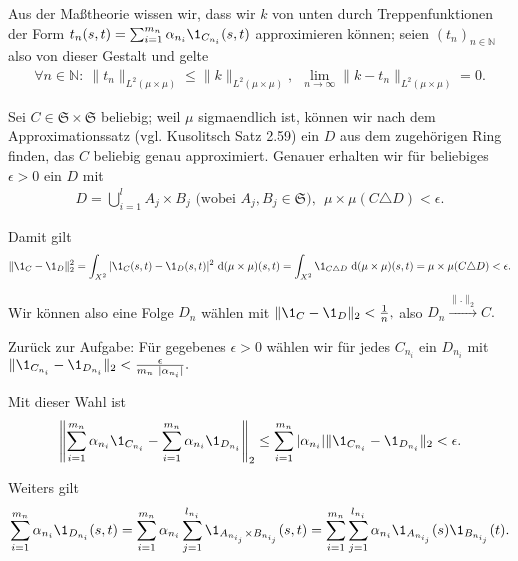 \begin{solution}
\begin{enumerate}[label = (\alph*)]
Aus der Maßtheorie wissen wir, dass wir $k$ von unten durch Treppenfunktionen der Form $t_n(s,t) = \sum_{i=1}^{m_n} \alpha_{n_i} \1_{C_{n_i}}(s,t)$ approximieren können; seien $(t_n)_{n \in \mathbb{N}}$ also von dieser Gestalt und gelte
\begin{align}
    \forall n \in \mathbb{N}:~ \|t_n\|_{L^2(\mu\times\mu)} \leq \|k\|_{L^2(\mu\times\mu)}, ~~\lim\limits_{n \rightarrow \infty}{\|k-t_n\|_{L^2(\mu\times\mu)}} = 0.
\end{align}

Sei $C \in \mathfrak{S} \times \mathfrak{S}$ beliebig; weil $\mu$ sigmaendlich ist, können wir nach dem Approximationssatz (vgl. Kusolitsch Satz 2.59) ein $D$ aus dem zugehörigen Ring finden, das $C$ beliebig genau approximiert. Genauer erhalten wir für beliebiges $\epsilon > 0$ ein $D$ mit
\begin{align}
    D = \bigcup_{i=1}^{l} A_j \times B_j \text{~(wobei~} A_j, B_j \in \mathfrak{S}), ~~\mu\times\mu(C \triangle D) < \epsilon.
\end{align}

Damit gilt
\begin{align}
    \|\1_C - \1_D\|_2^2 = \int_{X^2} |\1_C(s,t) - \1_D(s,t)|^2 ~\mathrm{d}(\mu\times\mu)(s,t) = \int_{X^2} \1_{C \triangle D}~\mathrm{d}(\mu\times\mu)(s,t) = \mu\times\mu(C \triangle D) < \epsilon.
\end{align}

Wir können also eine Folge $D_n$ wählen mit $\|\1_C - \1_D\|_2 < \frac{1}{n},$ also $D_n \xrightarrow{\|.\|_2} C.$

Zurück zur Aufgabe: Für gegebenes $\epsilon > 0$ wählen wir für jedes $C_{n_i}$ ein $D_{n_i}$ mit $\|\1_{C_{n_i}} - \1_{D_{n_i}}\|_2 < \frac{\epsilon}{m_n ~|\alpha_{n_i}|}.$

Mit dieser Wahl ist
\begin{align}
    \left\| \sum_{i=1}^{m_n} \alpha_{n_i} \1_{C_{n_i}} - \sum_{i=1}^{m_n} \alpha_{n_i} \1_{D_{n_i}}\right\|_2
    \leq \sum_{i=1}^{m_n} |\alpha_{n_i}| \|\1_{C_{n_i}} - \1_{D_{n_i}} \|_2 < \epsilon.
\end{align}

Weiters gilt
\begin{align}
    \sum_{i=1}^{m_n} \alpha_{n_i} \1_{D_{n_i}}(s,t)
    = \sum_{i=1}^{m_n} \alpha_{n_i} \sum_{j=1}^{l_{n_i}}  \1_{A_{n_{i_j}} \times B_{n_{i_j}}}(s,t)
    = \sum_{i=1}^{m_n} \sum_{j=1}^{l_{n_i}}   \alpha_{n_i} \1_{A_{n_{i_j}}}(s) \1_{B_{n_{i_j}}}(t).
\end{align}


\end{enumerate}
\end{solution}
